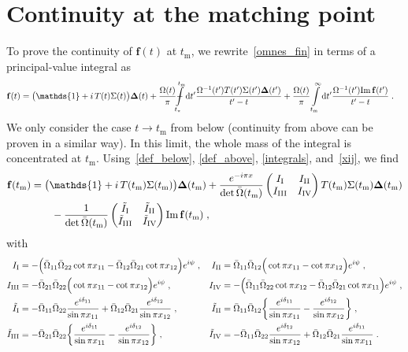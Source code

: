 \documentclass[11pt]{article}%
\def\Xint#1{\mathchoice
   {\XXint\displaystyle\textstyle{#1}}%
   {\XXint\textstyle\scriptstyle{#1}}%
   {\XXint\scriptstyle\scriptscriptstyle{#1}}%
   {\XXint\scriptscriptstyle\scriptscriptstyle{#1}}%
   \!\int}
\def\XXint#1#2#3{{\setbox0=\hbox{$#1{#2#3}{\int}$}
     \vcenter{\hbox{$#2#3$}}\kern-0.5\wd0}}
\providecommand{\dashint}[1][0pt]{\Xint{\hspace{#1}-}}%
\providecommand{\ec}{\;,}
\providecommand{\ep}{\;.}
\providecommand{\nt}{\notag}
\newcommand{\diff}{\text{d}}
\newcommand{\mpi}{M_{\pi}}
\newcommand{\unity}{\mathds{1}}
\newcommand{\tpi}{t_\pi}
\newcommand{\tm}{t_\text{m}}
\newcommand{\ff}{\mathbf{f}}
\newcommand{\Del}{\boldsymbol{\Delta}}
\renewcommand{\Im}{\text{Im}\,}
\providecommand{\unity}{\mathds{1}}
\begin{document}
\appendix



\section{Continuity at the matching point}
\label{app:continuity}

To prove the continuity of $\ff(t)$ at $\tm$, we rewrite~\eqref{omnes_fin} in terms of a principal-value integral as
\begin{align}
 \ff(t)&=\big(\unity+i\,T(t)\Sigma(t)\big)\Del(t)+\frac{\Omega(t)}{\pi}\dashint\limits_{\tpi}^{\tm}\diff t'\frac{\Omega^{-1}(t')T(t')\Sigma(t')\Del(t')}{t'-t}+
\frac{\Omega(t)}{\pi}\int\limits_{\tm}^\infty\diff t'\frac{\Omega^{-1}(t')\Im \ff(t')}{t'-t}\ep
\end{align}
We only consider the case $t\to\tm$ from below (continuity from above can be proven in a similar way). In this limit, the whole mass of the integral is concentrated at $\tm$. Using~\eqref{def_below}, \eqref{def_above}, \eqref{integrals}, and~\eqref{xij}, we find
\begin{align}
\label{cont_cond}
 \ff(\tm)&=\big(\unity+i\,T(\tm)\Sigma(\tm)\big)\Del(\tm)+\frac{e^{-i\pi x}}{\det\bar\Omega(\tm)}\begin{pmatrix} I_{\rm I} & I_{\rm II}\\ I_{\rm III} & I_{\rm IV}  \end{pmatrix} T(\tm)\Sigma(\tm)\Del(\tm)\nt\\
&\qquad- \frac{1}{\det\bar\Omega(\tm)}\begin{pmatrix} \tilde I_{\rm I} & \tilde I_{\rm II}\\ \tilde I_{\rm III} & \tilde I_{\rm IV}  \end{pmatrix} \Im\ff(\tm)\ec                                                                                      
\end{align}
with
\begin{align}
\label{def_I}
 I_{\rm I}&=-\Big(\bar\Omega_{11}\bar\Omega_{22}\cot\pi x_{11}-\bar\Omega_{12}\bar\Omega_{21}\cot\pi x_{12}\Big)e^{i\psi}\ec
&I_{\rm II}&=\bar\Omega_{11}\bar\Omega_{12}\Big(\cot\pi x_{11}-\cot\pi x_{12}\Big)e^{i\psi}\ec\nt\\
I_{\rm III}&=-\bar\Omega_{21}\bar\Omega_{22}\Big(\cot\pi x_{11}-\cot\pi x_{12}\Big)e^{i\psi}\ec
&I_{\rm IV}&=-\Big(\bar\Omega_{11}\bar\Omega_{22}\cot\pi x_{12}-\bar\Omega_{12}\bar\Omega_{21}\cot\pi x_{11}\Big)e^{i\psi}\ec\nt\\
%
\tilde I_{\rm I}&=-\bar\Omega_{11}\bar\Omega_{22}\frac{e^{i\delta_{11}}}{\sin\pi x_{11}}+\bar\Omega_{12}\bar\Omega_{21}\frac{e^{i\delta_{12}}}{\sin\pi x_{12}}\ec
&\tilde I_{\rm II}&=\bar\Omega_{11}\bar\Omega_{12}\bigg\{\frac{e^{i\delta_{11}}}{\sin\pi x_{11}}-\frac{e^{i\delta_{12}}}{\sin\pi x_{12}}\bigg\}\ec\nt\\
\tilde I_{\rm III}&=-\bar\Omega_{21}\bar\Omega_{22}\bigg\{\frac{e^{i\delta_{11}}}{\sin\pi x_{11}}-\frac{e^{i\delta_{12}}}{\sin\pi x_{12}}\bigg\}\ec
&\tilde I_{\rm IV}&=-\bar\Omega_{11}\bar\Omega_{22}\frac{e^{i\delta_{12}}}{\sin\pi x_{12}}+\bar\Omega_{12}\bar\Omega_{21}\frac{e^{i\delta_{11}}}{\sin\pi x_{11}}\ep
\end{align}
\end{document}
